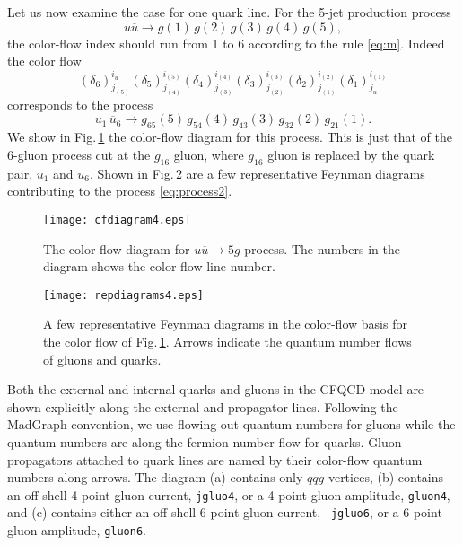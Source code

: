 \documentclass[a4paper,11pt]{article}
\begin{document}
Let us now examine the case for one quark line. For the 5-jet production process
\begin{equation}
u\overline{u}\rightarrow g(1)\,g(2)\,g(3)\,g(4)\,g(5),
\label{eq:process1}
\end{equation}
the color-flow index should run from 1 to 6
according to the rule \eqref{eq:m}. Indeed the color flow
\begin{equation}
 (\delta_6)^{i_u}_{j_{(5)}}(\delta_5)^{i_{(5)}}_{j_{(4)}}
(\delta_4)^{i_{(4)}}_{j_{(3)}}
(\delta_3)^{i_{(3)}}_{j_{(2)}}(\delta_2)^{i_{(2)}}_{j_{(1)}}
(\delta_1)^{i_{(1)}}_{j_u}
\label{eq:deltas}
\end{equation}
corresponds to the process
 \begin{equation}
 u_1\,\overline{u}_6\rightarrow
g_{65}(5)\,g_{54}(4)\,g_{43}(3)\,g_{32}(2)\,g_{21}(1).
\label{eq:process2}
\end{equation}
We show in Fig.\,\ref{fig:cfdiagram} the color-flow diagram for this
process. This is just that of the 6-gluon process cut at the
$g_{16}$ gluon, where $g_{16}$ gluon is replaced by the quark pair, $u_1$
and $\overline{u}_6$. Shown in Fig.\,\ref{fig:repdiagrams} are a few representative Feynman
diagrams contributing to the process \eqref{eq:process2}.
\begin{figure}
\begin{center}
\texttt{[image: cfdiagram4.eps]}
\caption{The color-flow diagram for $u\overline{u}\rightarrow
 5g$ process. The numbers in the diagram shows the color-flow-line number.}
\label{fig:cfdiagram}
\end{center}
\end{figure}
\begin{figure}
\begin{center}
\texttt{[image: repdiagrams4.eps]}
\caption{A few representative Feynman diagrams in the color-flow basis
 for the color flow of Fig.\,\ref{fig:cfdiagram}. Arrows indicate the
 quantum number flows of gluons and quarks.}
\label{fig:repdiagrams}
\end{center}
\end{figure}
Both the external and internal quarks and gluons in the CFQCD model are
shown explicitly along the external and propagator lines. Following the
MadGraph convention, we use flowing-out quantum numbers for gluons while
the quantum numbers are along the fermion number flow for quarks. Gluon
propagators attached to quark lines are named by their color-flow
quantum numbers along arrows. The diagram (a) contains
only $qqg$ vertices, (b) contains an off-shell 4-point gluon current,
{\tt jgluo4}, or a 4-point gluon amplitude, {\tt gluon4}, and (c) contains either an off-shell 6-point gluon current, {\tt
jgluo6}, or a 6-point gluon amplitude, {\tt gluon6}.
\end{document}
